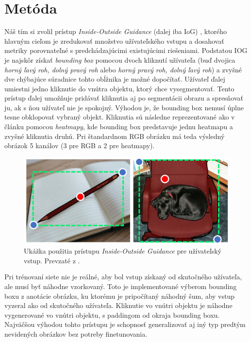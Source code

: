 \documentclass [11pt, a4paper, twocolumn]{article}
\begin{document}
\section{Metóda}
Náš tím si zvolil prístup \textit{Inside-Outside Guidance} (dalej iba IoG) \cite{zhang_liew_wei_wei_zhao_2020}, ktorého hlavným cieľom je zredukovať množstvo užívateľského vstupu a dosahovať metriky porovnateľné s predchádzajúcimi existujúcimi riešeniami. Podstatou IOG je najskôr získať \textit{bounding box} pomocou dvoch kliknutí užívateľa (buď dvojica \textit{horný ľavý roh, dolný pravý roh} alebo \textit{horný pravý roh, dolný ľavý roh}) a zvyšné dve chýbajúce súradnice tohto obĺžnika je možné dopočítať. Užívateľ ďalej umiestni jedno kliknutie do vnútra objektu, ktorý chce vysegmentovať. Tento prístup ďalej umožňuje pridávať kliknutia aj po segmentácii obrazu a spresňovať ju, ak s ňou užívateľ nie je spokojný. Výhodou je, že bounding box nemusí úplne tesne obklopovať vybraný objekt. Kliknutia sú následne reprezentované ako v článku \cite{maninis} pomocou \textit{heatmapy}, kde bounding box predstavuje jednu heatmapu a zvyšné kliknutia druhú. Pri štandardnom RGB obrázku má teda výsledný obrázok 5 kanálov (3 pre RGB a 2 pre heatmapy).

\begin{figure}[H]
\centering
\includegraphics[width=\linewidth]{IoG}
\caption{Ukážka použitia prístupu \textit{Inside-Outside Guidance} pre užívateľský vstup. Prevzaté z \cite{zhang_liew_wei_wei_zhao_2020}.}
\end{figure}

Pri trénovaní siete nie je reálné, aby bol vstup získaný od skutočného užívateľa, ale musí byť náhodne vzorkovaný. Toto je implementované výberom bounding boxu z anotácie obrázku, ku ktorému je pripočítaný náhodný šum, aby vstup vyzeral ako od skutočného užívateľa. Kliknutie vo vnútri objektu je náhodne vygenerované vo vnútri objektu, s paddingom od okraja bounding boxu. Najväčšou výhodou tohto prístupu je schopnosť generalizovať aj iný typ predtým nevidených obrázkov bez potreby finetunovania.  
\end{document}
